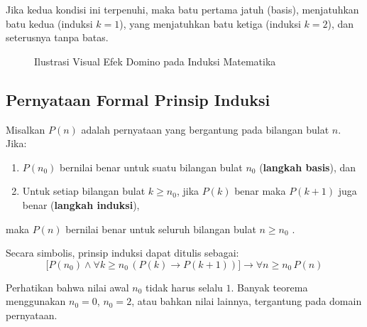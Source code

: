 Jika kedua kondisi ini terpenuhi, maka batu pertama jatuh (basis), menjatuhkan batu kedua (induksi $k=1$), yang menjatuhkan batu ketiga (induksi $k=2$), dan seterusnya tanpa batas.

\begin{figure}[H]
\centering
{}
\caption{Ilustrasi Visual Efek Domino pada Induksi Matematika}
\label{fig:domino-induksi}
\end{figure}

\subsection{Pernyataan Formal Prinsip Induksi}

\begin{definisi}
Misalkan $P(n)$ adalah pernyataan yang bergantung pada bilangan bulat $n$. Jika:
\begin{enumerate}
    \item $P(n_0)$ bernilai benar untuk suatu bilangan bulat $n_0$ (\textbf{langkah basis}), dan
    \item Untuk setiap bilangan bulat $k \geq n_0$, jika $P(k)$ benar maka $P(k+1)$ juga benar (\textbf{langkah induksi}),
\end{enumerate}
maka $P(n)$ bernilai benar untuk seluruh bilangan bulat $n \geq n_0$ \cite{wiki_mathematical_induction}.
\end{definisi}

Secara simbolis, prinsip induksi dapat ditulis sebagai:
\[ \Big[ P(n_0) \wedge \forall k \geq n_0\, (P(k) \rightarrow P(k+1)) \Big] \rightarrow \forall n \geq n_0\, P(n) \]

Perhatikan bahwa nilai awal $n_0$ tidak harus selalu $1$. Banyak teorema menggunakan $n_0 = 0$, $n_0 = 2$, atau bahkan nilai lainnya, tergantung pada domain pernyataan.
